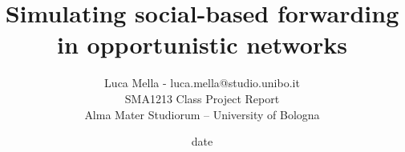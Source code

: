 \documentclass[a4paper]{article}
\begin{document}
\title{Simulating social-based forwarding in opportunistic networks}
\author{Luca Mella - luca.mella@studio.unibo.it \\ SMA1213 Class Project Report \\ Alma Mater Studiorum -- University of Bologna \\ }
\date{date}

\maketitle


\sloppy



\newpage

\
\newpage


\newpage


\newpage


\newpage


\newpage
\nocite{*}
{}
 
\end{document}
